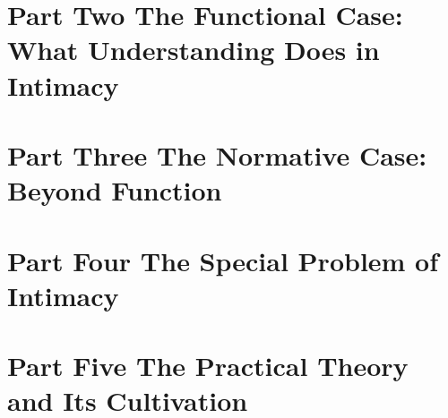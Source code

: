 



\part*{\textcolor{rosedeep}{Part Two \quad The Functional Case: What Understanding Does in Intimacy}}







\part*{\textcolor{rosedeep}{Part Three \quad The Normative Case: Beyond Function}}





\part*{\textcolor{rosedeep}{Part Four \quad The Special Problem of Intimacy}}




\part*{\textcolor{rosedeep}{Part Five \quad The Practical Theory and Its Cultivation}}

